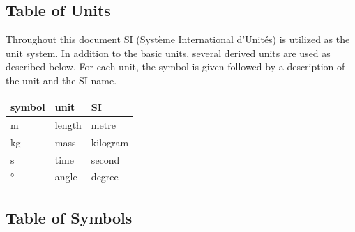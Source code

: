 \documentclass[12pt]{article}
\begin{document}
\subsection{Table of Units}

Throughout this document SI (Syst\`{e}me International d'Unit\'{e}s) is
utilized as the unit system. In addition to the basic units, several derived
units are used as described below.  
For each unit, the symbol is given followed by a
description of the unit and the SI name.

\renewcommand{\arraystretch}{1.2}
\begin{center}
  \noindent \begin{tabular}{l l l} 
    \toprule		
    \textbf{symbol} & \textbf{unit} & \textbf{SI}\\
    \midrule 
    \si{\metre} & length & metre\\
    \si{\kilogram} & mass & kilogram\\
    \si{\second} & time & second\\
    \si{\degree} & angle & degree\\
    \bottomrule
  \end{tabular}
\end{center}

\subsection{Table of Symbols}
\end{document}
